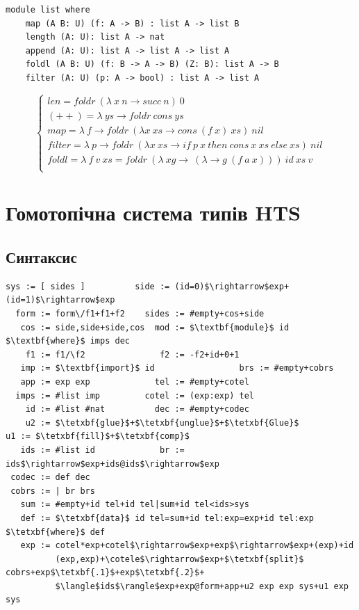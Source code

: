 \begin{lstlisting}[mathescape=true]
module list where
    map (A B: U) (f: A -> B) : list A -> list B
    length (A: U): list A -> nat
    append (A: U): list A -> list A -> list A
    foldl (A B: U) (f: B -> A -> B) (Z: B): list A -> B
    filter (A: U) (p: A -> bool) : list A -> list A
\end{lstlisting}
$$
\begin{cases}
len = foldr\ (\lambda\ x\ n \rightarrow succ\ n)\ 0\\
(++) = \lambda\ ys \rightarrow foldr\ cons\ ys\\
map = \lambda\ f \rightarrow foldr\ (\lambda x\ xs \rightarrow cons\ (f\ x)\ xs)\ nil\\
filter = \lambda\ p \rightarrow foldr\ (\lambda x\ xs \rightarrow if\ p\ x\ then\ cons\ x\ xs\ else\ xs)\ nil\\
foldl = \lambda\ f\ v\ xs = foldr\ (\lambda\ xg\rightarrow\ (\lambda \rightarrow g\ (f\ a\ x)))\ id\ xs\ v\\
\end{cases}
$$

\section{Гомотопічна система типів HTS}

\subsection{Синтаксис}

\begin{lstlisting}[mathescape=true]
   sys := [ sides ]          side := (id=0)$\rightarrow$exp+(id=1)$\rightarrow$exp
  form := form\/f1+f1+f2    sides := #empty+cos+side
   cos := side,side+side,cos  mod := $\textbf{module}$ id $\textbf{where}$ imps dec
    f1 := f1/\f2               f2 := -f2+id+0+1
   imp := $\textbf{import}$ id                 brs := #empty+cobrs
   app := exp exp             tel := #empty+cotel
  imps := #list imp         cotel := (exp:exp) tel
    id := #list #nat          dec := #empty+codec
    u2 := $\tetxbf{glue}$+$\tetxbf{unglue}$+$\tetxbf{Glue}$                   u1 := $\tetxbf{fill}$+$\tetxbf{comp}$
   ids := #list id             br := ids$\rightarrow$exp+ids@ids$\rightarrow$exp
 codec := def dec
 cobrs := | br brs
   sum := #empty+id tel+id tel|sum+id tel<ids>sys
   def := $\tetxbf{data}$ id tel=sum+id tel:exp=exp+id tel:exp $\tetxbf{where}$ def
   exp := cotel*exp+cotel$\rightarrow$exp+exp$\rightarrow$exp+(exp)+id
          (exp,exp)+\cotele$\rightarrow$exp+$\tetxbf{split}$ cobrs+exp$\tetxbf{.1}$+exp$\tetxbf{.2}$+
          $\langle$ids$\rangle$exp+exp@form+app+u2 exp exp sys+u1 exp sys
\end{lstlisting}

